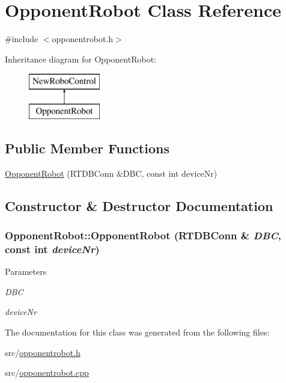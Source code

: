 \hypertarget{classOpponentRobot}{
\section{OpponentRobot Class Reference}
\label{classOpponentRobot}
}


{\ttfamily \#include $<$opponentrobot.h$>$}

Inheritance diagram for OpponentRobot:\begin{figure}[H]
\begin{center}
\leavevmode
\includegraphics[height=2cm]{classOpponentRobot}
\end{center}
\end{figure}
\subsection*{Public Member Functions}
\begin{DoxyCompactItemize}
\item 
\hyperlink{classOpponentRobot_a315c08a9f17d278b1bb8067929b38f83}{OpponentRobot} (RTDBConn \&DBC, const int deviceNr)
\end{DoxyCompactItemize}


\subsection{Constructor \& Destructor Documentation}
\hypertarget{classOpponentRobot_a315c08a9f17d278b1bb8067929b38f83}{
\subsubsection[{OpponentRobot}]{\setlength{\rightskip}{0pt plus 5cm}OpponentRobot::OpponentRobot (RTDBConn \& {\em DBC}, \/  const int {\em deviceNr})}}
\label{classOpponentRobot_a315c08a9f17d278b1bb8067929b38f83}

\begin{DoxyParams}{Parameters}
\item[{\em DBC}]\item[{\em deviceNr}]\end{DoxyParams}


The documentation for this class was generated from the following files:\begin{DoxyCompactItemize}
\item 
src/\hyperlink{opponentrobot_8h}{opponentrobot.h}\item 
src/\hyperlink{opponentrobot_8cpp}{opponentrobot.cpp}\end{DoxyCompactItemize}

